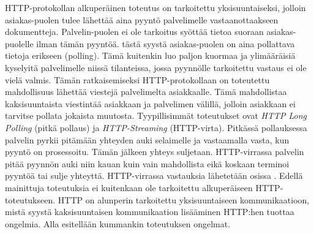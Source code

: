 \documentclass[utf8]{gradu3}
\begin{document}
HTTP-protokollan alkuperäinen toteutus on tarkoitettu yksisuuntaiseksi, jolloin asiakas-puolen tulee lähettää aina pyyntö palvelimelle vastaanottaakseen dokumentteja. Palvelin-puolen ei ole tarkoitus syöttää tietoa suoraan asiakas-puolelle ilman tämän pyyntöä. tästä syystä asiakas-puolen on aina pollattava tietoja erikseen (polling). Tämä kuitenkin luo paljon kuormaa ja ylimääräisiä kyselyitä palvelimelle niissä tilanteissa, jossa pyynnölle tarkoitettu vastaus ei ole vielä valmis. Tämän ratkaisemiseksi HTTP-protokollaan on toteutettu mahdollisuus lähettää viestejä palvelimelta asiakkaalle. Tämä mahdollistaa kaksisuuntaista viestintää asiakkaan ja palvelimen välillä, jolloin asiakkaan ei tarvitse pollata jokaista muutosta. Tyypillisimmät toteutukset ovat \emph{HTTP Long Polling} (pitkä pollaus) ja \emph{HTTP-Streaming} (HTTP-virta). Pitkässä pollauksessa palvelin pyrkii pitämään yhteyden auki selaimelle ja vastaamalla vasta, kun pyyntö on prosessoitu. Tämän jälkeen yhteys suljetaan. HTTP-virrassa palvelin pitää pyynnön auki niin kauan kuin vain mahdollista eikä koskaan terminoi pyyntöä tai sulje yhteyttä. HTTP-virrassa vastauksia lähetetään osissa \parencite[s. 2]{long_polling}. Edellä mainittuja toteutuksia ei kuitenkaan ole tarkoitettu alkuperäiseen HTTP-toteutukseen. HTTP on alunperin tarkoitettu yksisuuntaiseen kommunikaatioon, mistä syystä kaksisuuntaisen kommunikaation lisääminen HTTP:hen tuottaa ongelmia. Alla esitellään kummankin toteutuksen ongelmat.
\end{document}
